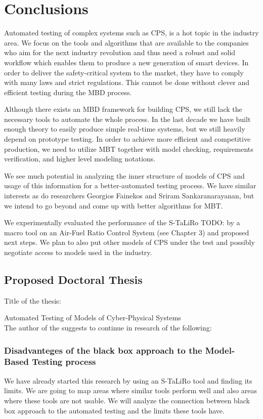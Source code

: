\chapter{Conclusions}
% 

Automated testing of complex systems such as CPS, is a hot topic in the industry area. We focus on the tools and algorithms that are available to the companies who aim for the next industry revolution and thus need a robust and solid workflow which enables them to produce a new generation of smart devices. In order to deliver the safety-critical system to the market, they have to comply with many laws and strict regulations. This cannot be done without clever and efficient testing during the MBD process.

Although there exists an MBD framework for building CPS, we still lack the necessary tools to automate the whole process. In the last decade we have built enough theory to easily produce simple real-time systems, but we still heavily depend on prototype testing. In order to achieve more efficient and competitive production, we need to utilize MBT together with model checking, requirements verification, and higher level modeling notations.

We see much potential in analyzing the inner structure of models of CPS and usage of this information for a better-automated testing process. We have similar interests as do researchers Georgios Fainekos and Sriram Sankaranarayanan, but we intend to go beyond and come up with better algorithms for MBT.

We experimentally evaluated the performance of the S-TaLiRo TODO: by a macro tool on an Air-Fuel Ratio Control System  (see Chapter 3) and proposed next steps. We plan to also put other models of CPS under the test and possibly negotiate access to models used in the industry.

\section{Proposed Doctoral Thesis}
Title of the thesis:

Automated Testing of Models of Cyber-Physical Systems
\\
The author of the \thesis{} suggests to continue in research of the following:
\subsection{Disadvanteges of the black box approach to the Model-Based Testing process}
We have already started this research by using an S-TaLiRo tool and finding its limits. We are going to map areas where similar tools perform well and also areas where these tools are not usable. We will analyze the connection between black box approach to the automated testing and the limits these tools have.

